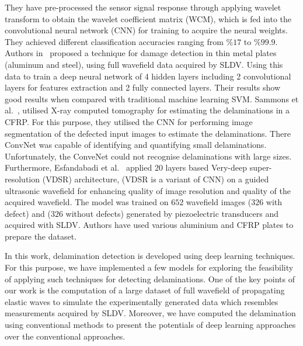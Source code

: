 \documentclass[preprint,9pt]{elsarticle}
\begin{document}
  	They have pre-processed the sensor signal response through applying wavelet transform to obtain the wavelet coefficient matrix (WCM), which is fed into the convolutional neural network (CNN) for training to acquire the neural weights. They achieved different classification accuracies ranging from \(\%17\) to \(\%99.9\).
 	Authors in~\cite{Melville2018} proposed a technique for damage detection in thin metal plates (aluminum and steel), using full wavefield data acquired by SLDV. Using this data to train a deep neural network of 4 hidden layers including 2 convolutional layers for features extraction and 2 fully connected layers. 
  	Their results show good results when compared with traditional machine learning SVM.
  	Sammons et al.~\cite{sammons2016segmenting}, utilised X-ray computed tomography for estimating the delaminations in a CFRP. For this purpose, they utilised the CNN for performing image segmentation of the defected input images to estimate the delaminations. There ConvNet was capable of identifying  and quantifying small delaminations. 
  	Unfortunately, the ConveNet could not recognise delaminations with large sizes.
	Furthermore, Esfandabadi et al.~\cite{esfandabadideep} applied 20 layers based Very-deep super-resolution (VDSR) architecture, (VDSR is a variant of CNN) on a guided ultrasonic wavefield for enhancing quality of image resolution and quality of the acquired wavefield. 
	The model was trained on \(652\) wavefield images (\(326\) with defect) and (\(326\) without defects) generated by piezoelectric transducers and acquired with SLDV. 
	Authors have used various aluminium and CFRP plates to prepare the dataset.
        
	In this work, delamination detection is developed using deep learning techniques.
	For this purpose, we have implemented a few models for exploring the feasibility of applying such techniques for detecting delaminations.
	One of the key points of our work is the computation of a large dataset of full wavefield of propagating elastic waves to simulate the experimentally generated data which resembles measurements acquired by SLDV. 
	Moreover, we have computed the delamination using conventional methods to present the potentials of deep learning approaches over the conventional approaches.
	
\end{document}
